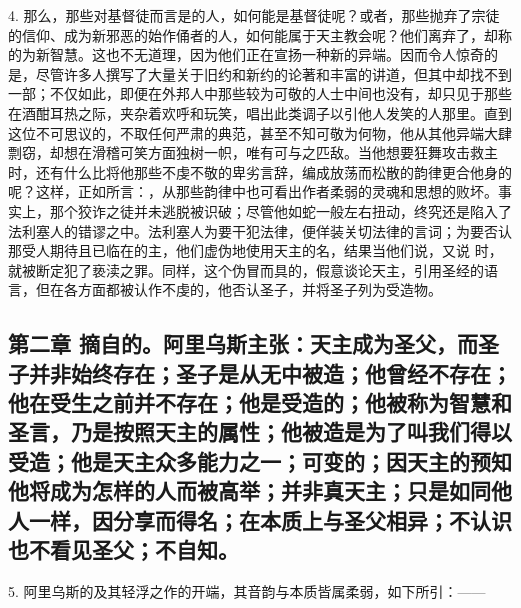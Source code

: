 4. 那么，那些对基督徒而言是的人，如何能是基督徒呢？或者，那些抛弃了宗徒的信仰、成为新邪恶的始作俑者的人，如何能属于天主教会呢？他们离弃了，却称的为新智慧。这也不无道理，因为他们正在宣扬一种新的异端。因而令人惊奇的是，尽管许多人撰写了大量关于旧约和新约的论著和丰富的讲道，但其中却找不到一部；不仅如此，即便在外邦人中那些较为可敬的人士中间也没有，却只见于那些在酒酣耳热之际，夹杂着欢呼和玩笑，唱出此类调子以引他人发笑的人那里。直到这位不可思议的，不取任何严肃的典范，甚至不知可敬为何物，他从其他异端大肆剽窃，却想在滑稽可笑方面独树一帜，唯有可与之匹敌。当他想要狂舞攻击救主时，还有什么比将他那些不虔不敬的卑劣言辞，编成放荡而松散的韵律更合他身的呢？这样，正如所言：，从那些韵律中也可看出作者柔弱的灵魂和思想的败坏。事实上，那个狡诈之徒并未逃脱被识破；尽管他如蛇一般左右扭动，终究还是陷入了法利塞人的错谬之中。法利塞人为要干犯法律，便佯装关切法律的言词；为要否认那受人期待且已临在的主，他们虚伪地使用天主的名，结果当他们说，又说 时，就被断定犯了亵渎之罪。同样，这个伪冒而具的，假意谈论天主，引用圣经的语言，但在各方面都被认作不虔的，他否认圣子，并将圣子列为受造物。\par


\subsection{第二章 摘自的。阿里乌斯主张：天主成为圣父，而圣子并非始终存在；圣子是从无中被造；他曾经不存在；他在受生之前并不存在；他是受造的；他被称为智慧和圣言，乃是按照天主的属性；他被造是为了叫我们得以受造；他是天主众多能力之一；可变的；因天主的预知他将成为怎样的人而被高举；并非真天主；只是如同他人一样，因分享而得名；在本质上与圣父相异；不认识也不看见圣父；不自知。}

5. 阿里乌斯的及其轻浮之作的开端，其音韵与本质皆属柔弱，如下所引：——\par

\par

